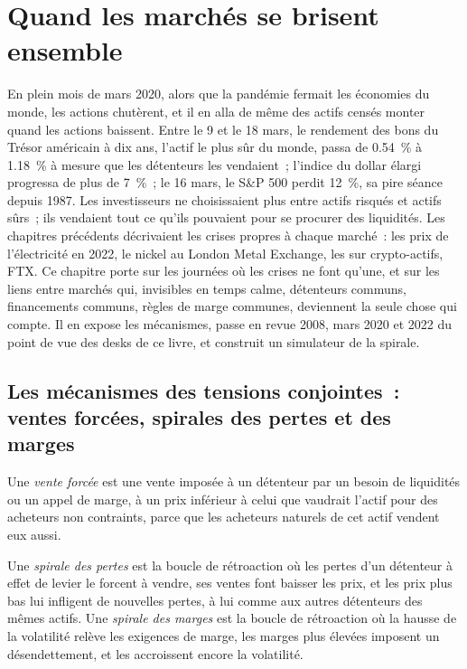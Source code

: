 \chapter{Quand les marchés se brisent ensemble}\label{ch:m3:when-markets-break-together}

En plein mois de mars 2020, alors que la pandémie fermait les économies du monde, les actions chutèrent, et il en alla de même des actifs censés monter quand les actions baissent.
Entre le 9 et le 18 mars, le rendement des bons du Trésor américain à dix ans, l'actif le plus sûr du monde,
passa de 0.54~\% à 1.18~\% à mesure que les détenteurs les vendaient~; l'indice du dollar élargi
progressa de plus de 7~\%~; le 16 mars, le S\&P 500 perdit 12~\%, sa pire séance depuis 1987. Les investisseurs ne choisissaient plus
entre actifs risqués et actifs sûrs~; ils vendaient tout ce qu'ils pouvaient pour se procurer des liquidités.
Les chapitres précédents décrivaient les crises propres à chaque marché~: les prix de l'électricité en 2022, le nickel au London Metal
Exchange, les  sur crypto-actifs, FTX. Ce chapitre porte sur les journées où les crises ne font qu'une, et sur les liens entre marchés qui, invisibles en temps calme,
détenteurs communs, financements communs, règles de marge communes, deviennent la seule chose qui compte.
Il en expose les mécanismes, passe en revue
2008, mars 2020 et 2022 du point de vue des desks de ce livre, et construit un
simulateur de la spirale.

\section{Les mécanismes des tensions conjointes~: ventes forcées, spirales des pertes et des marges}

\begin{definition}\label{def:m3:when-markets-break-together:fire}
Une \emph{vente forcée} est une vente imposée à un détenteur par un besoin de liquidités ou un appel de marge, à un prix
inférieur à celui que vaudrait l'actif pour des acheteurs non contraints, parce que les acheteurs naturels de cet actif vendent eux aussi.
\end{definition}

\begin{definition}\label{def:m3:when-markets-break-together:spirals}
Une \emph{spirale des pertes} est la boucle de rétroaction où les pertes d'un détenteur à effet de levier le forcent à vendre, ses ventes font baisser les prix, et les
prix plus bas lui infligent de nouvelles pertes, à lui comme aux autres détenteurs des mêmes actifs. Une \emph{spirale des marges} est la boucle de rétroaction
où la hausse de la volatilité relève les exigences de marge, les marges plus élevées imposent un désendettement, et les  accroissent encore la volatilité.
\end{definition}

